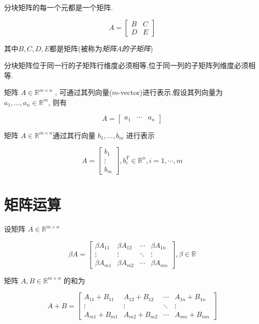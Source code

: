 \begin{definition}[分块矩阵]
    分块矩阵的每一个元都是一个矩阵.

    $$ A=\left[\begin{array}{ll}B & C \\ D & E\end{array}\right] $$

    其中$B,C,D,E$都是矩阵(被称为\textit{矩阵$A$的子矩阵})
\end{definition}

分块矩阵位于同一行的子矩阵行维度必须相等,位于同一列的子矩阵列维度必须相等.

\begin{definition}
    矩阵 $ A \in \mathbb{R}^{m \times n} $ , 可通过其列向量($m$-vector)进行表示,假设其列向量为 $ a_{1}, \ldots, a_{n} \in \mathbb{R}^{m} $, 则有

    $$ A=\left[\begin{array}{lll}a_{1} & \cdots & a_{n}\end{array}\right] $$
\end{definition}

\begin{definition}
    矩阵 $ A \in \mathbb{R}^{m \times n} $通过其行向量 $ b_{1}, \ldots, b_{m} $ 进行表示

    $$ A=\left[\begin{array}{c}b_{1} \\ \vdots \\ b_{m}\end{array}\right], b_{i}^{T} \in \mathbb{R}^{n}, i=1, \cdots, m $$
\end{definition}

\section{矩阵运算}

\begin{definition}[矩阵数乘]
    设矩阵 $ A \in \mathbb{R}^{m \times n} $

    $$ \beta A=\left[\begin{array}{cccc}\beta A_{11} & \beta A_{12} & \cdots & \beta A_{1 n} \\ \vdots & \vdots & \ddots & \vdots \\ \beta A_{m 1} & \beta A_{m 2} & \cdots & \beta A_{m n}\end{array}\right], \beta \in \mathbb{R} $$
\end{definition}

\begin{definition}[矩阵加法]
    矩阵 $ A, B \in \mathbb{R}^{m \times n} $ 的和为

    $$ A+B=\left[\begin{array}{cccc}A_{11}+B_{11} & A_{12}+B_{12} & \cdots & A_{1 n}+B_{1 n} \\ \vdots & \vdots & \ddots & \vdots \\ A_{m 1}+B_{m 1} & A_{m 2}+B_{m 2} & \cdots & A_{m n}+B_{m n}\end{array}\right] $$
\end{definition}

